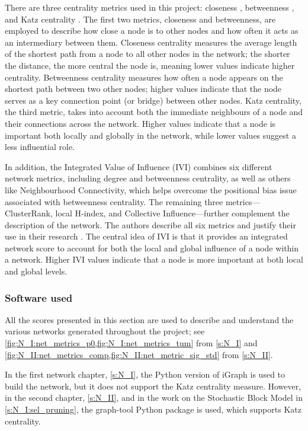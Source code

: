 There are three centrality metrics used in this project: closeness \citep{Opsahl2010-ok}, betweenness \citep{Freeman1977-qe}, and Katz centrality \citep{Katz1953-ie}. The first two metrics, closeness and betweenness, are employed to describe how close a node is to other nodes and how often it acts as an intermediary between them. Closeness centrality measures the average length of the shortest path from a node to all other nodes in the network; the shorter the distance, the more central the node is, meaning lower values indicate higher centrality. Betweenness centrality measures how often a node appears on the shortest path between two other nodes; higher values indicate that the node serves as a key connection point (or bridge) between other nodes. Katz centrality, the third metric, takes into account both the immediate neighbours of a node and their connections across the network. Higher values indicate that a node is important both locally and globally in the network, while lower values suggest a less influential role.

 
In addition, the Integrated Value of Influence (IVI) \cite{Salavaty2020-wo} combines six different network metrics, including degree and betweenness centrality, as well as others like Neighbourhood Connectivity, which helps overcome the positional bias issue associated with betweenness centrality. The remaining three metrics—ClusterRank, local H-index, and Collective Influence—further complement the description of the network. The authors describe all six metrics and justify their use in their research \citet{Salavaty2020-wo}. The central idea of IVI is that it provides an integrated network score to account for both the local and global influence of a node within a network. Higher IVI values indicate that a node is more important at both local and global levels.


\subsubsection*{Software used} \label{s:lit:net_software}

All the scores presented in this section are used to describe and understand the various networks generated throughout the project; see \cref{fig:N_I:net_metrics_p0,fig:N_I:net_metrics_tum} from \cref{s:N_I} and \cref{fig:N_II:net_metrics_comp,fig:N_II:net_metric_sig_std} from \cref{s:N_II}. 

In the first network chapter, \cref{s:N_I}, the Python version of iGraph \citep{Csardi2006-ez} is used to build the network, but it does not support the Katz centrality measure. However, in the second chapter, \cref{s:N_II}, and in the work on the Stochastic Block Model in \cref{s:N_I:sel_pruning}, the graph-tool Python package \citep{Peixoto2014-ls} is used, which supports Katz centrality.
